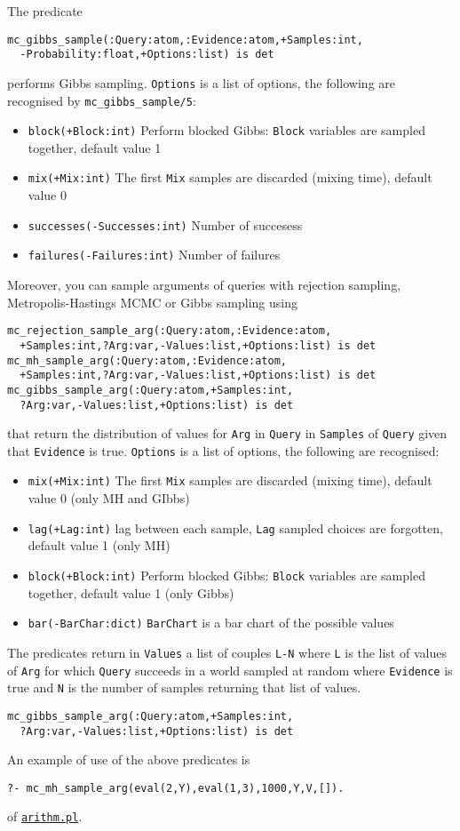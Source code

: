 The predicate
\begin{verbatim}
mc_gibbs_sample(:Query:atom,:Evidence:atom,+Samples:int,
  -Probability:float,+Options:list) is det
\end{verbatim}
performs Gibbs sampling.
\verb|Options| is a list of options, the following are recognised by \verb|mc_gibbs_sample/5|:
\begin{itemize}
\item \verb|block(+Block:int)|
   Perform blocked Gibbs: \verb|Block| variables are sampled together, default value 1
\item \verb|mix(+Mix:int)|
   The first \verb|Mix| samples are discarded (mixing time), default value 0
\item \verb|successes(-Successes:int)|
Number of succesess
\item \verb|failures(-Failures:int)|
Number of failures
\end{itemize}
Moreover, you can sample arguments of queries with rejection sampling, Metropolis-Hastings MCMC or Gibbs sampling using
\begin{verbatim}
mc_rejection_sample_arg(:Query:atom,:Evidence:atom,
  +Samples:int,?Arg:var,-Values:list,+Options:list) is det
mc_mh_sample_arg(:Query:atom,:Evidence:atom,
  +Samples:int,?Arg:var,-Values:list,+Options:list) is det
mc_gibbs_sample_arg(:Query:atom,+Samples:int,
  ?Arg:var,-Values:list,+Options:list) is det
\end{verbatim}
that return the distribution of values for \verb|Arg| in \verb|Query| in \verb|Samples| of
\verb|Query| given that \verb|Evidence| is true.
\verb|Options| is a list of options, the following are recognised:
\begin{itemize}
\item \verb|mix(+Mix:int)|
The first  \verb|Mix| samples are discarded (mixing time), default value 0 (only MH and GIbbs)
\item \verb|lag(+Lag:int)|
lag between each sample, \verb|Lag| sampled choices are forgotten, default value 1 (only MH)
\item \verb|block(+Block:int)|
   Perform blocked Gibbs: \verb|Block| variables are sampled together, default value 1 (only Gibbs)
\item \verb|bar(-BarChar:dict)|
    \verb|BarChart| is a bar chart of the possible values
\end{itemize}
The predicates return in \verb|Values| a list of couples \verb|L-N| where
\verb|L| is the list of values of \verb|Arg| for which \verb|Query|
succeeds in a world sampled at random where \verb|Evidence| is true and \verb|N|
is the number of samples returning that list of values.
\begin{verbatim}
mc_gibbs_sample_arg(:Query:atom,+Samples:int,
  ?Arg:var,-Values:list,+Options:list) is det
\end{verbatim}
An example of use of the above predicates is
\begin{verbatim}
?- mc_mh_sample_arg(eval(2,Y),eval(1,3),1000,Y,V,[]).
\end{verbatim}
of \href{http://cplint.eu/example/inference/arithm.pl}{\texttt{arithm.pl}}.


